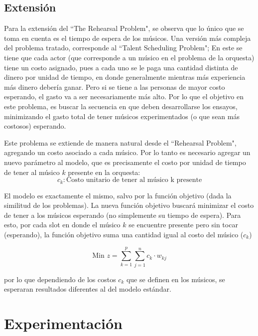 \documentclass[journal, 10pt]{IEEEtran}
\begin{document}
\subsection{Extensión}
Para la extensión del ``The Rehearsal Problem", se observa que lo único que se toma en cuenta es el tiempo de espera de los músicos. Una versión más compleja del problema tratado, corresponde al ``Talent Scheduling Problem"; En este se tiene que cada actor (que corresponde a un músico en el problema de la orquesta) tiene un costo asignado, pues a cada uno se le paga una cantidad distinta de dinero por unidad de tiempo, en donde generalmente mientras más experiencia más dinero debería ganar. Pero si se tiene a las personas de mayor costo esperando, el gasto va a ser necesariamente más alto. Por lo que el objetivo en este problema, es buscar la secuencia en que deben desarrollarse los ensayos, minimizando el gasto total de tener músicos experimentados (o que sean más costosos) esperando.

Este problema se extiende de manera natural desde el ``Rehearsal Problem", agregando un costo asociado a cada músico. Por lo tanto  es necesario agregar un nuevo parámetro al modelo, que es precisamente el costo por unidad de tiempo de tener al músico $k$ presente en la orquesta:
	$$c_k : \text{Costo unitario de tener al músico k presente} $$
	
El modelo es exactamente el mismo, salvo por la función objetivo (dada la similitud de los problemas). La nueva función objetivo buscará minimizar el costo de tener a los músicos esperando (no simplemente su tiempo de espera). Para esto, por cada slot en donde el músico $k$ se encuentre presente pero sin tocar (esperando), la función objetivo suma una cantidad igual al costo del músico ($c_k$)

\begin{equation} \label{eq:FO2}
\text{Min } z = \sum_{k=1}^{p}\sum_{j=1}^n c_{k} \cdot w_{kj} 
\end{equation}

por lo que dependiendo de los costos $c_k$ que se definen en los músicos, se esperaran resultados diferentes al del modelo estándar.

\section{Experimentación}
\end{document}
